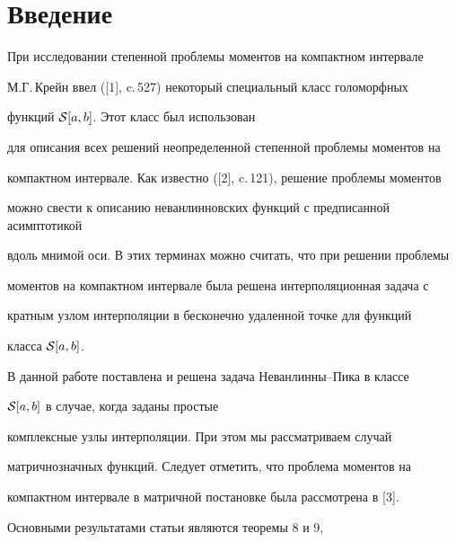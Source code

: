 

\maketitle


\label{begin}








\section{Введение}





При исследовании степенной проблемы моментов на компактном интервале


М.Г.\,Крейн ввел ([1], c.\,527)  некоторый специальный класс голоморфных


функций ${\cal S}[a,b]$. Этот класс был использован


для описания всех решений неопределенной степенной проблемы моментов на


компактном интервале. Как известно ([2], c.\,121), решение проблемы моментов


можно свести к описанию неванлинновских функций с предписанной асимптотикой


вдоль мнимой оси. В этих терминах можно считать, что при решении проблемы


моментов на компактном интервале была  решена интерполяционная задача с


кратным узлом интерполяции в бесконечно удаленной точке для функций


класса ${\cal S}[a,b]$.





В данной работе поставлена и решена задача Неванлинны--Пика в классе


${\cal S}[a,b]$  в случае, когда заданы простые


комплексные узлы интерполяции. При этом мы рассматриваем случай


матричнозначных функций. Следует отметить, что проблема моментов на


компактном интервале в матричной постановке была рассмотрена в [3].





Основными результатами статьи являются теоремы 8 и 9,


